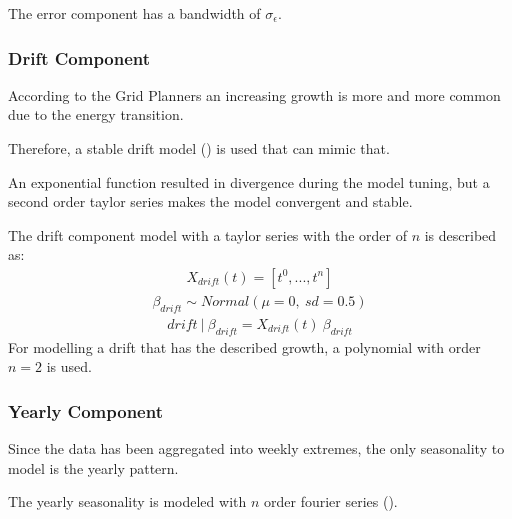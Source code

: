 \documentclass[letterpaper,10pt,english]{sphinxmanual}
\begin{document}
The error component has a bandwidth of \(\sigma_\epsilon\).


\subsubsection{Drift Component}
\label{\detokenize{modeling:drift-component}}
According to the Grid Planners an increasing growth is more and more common due to the energy transition.

Therefore, a stable drift model ({\hyperref[\detokenize{autoapi/src/model/model/index:src.model.model.drift_model}]{}}) is used that can mimic that.

An exponential function resulted in divergence during the model tuning, but a second order taylor series makes the model convergent and stable.

The drift component model with a taylor series with the order of \(n\) is described as:
\begin{equation*}
\begin{split}X_{drift}(t) = [t^0, ...,  t^n]\end{split}
\end{equation*}\begin{equation*}
\begin{split}\beta_{drift} \sim Normal(\mu=0, \:sd=0.5)\end{split}
\end{equation*}\begin{equation*}
\begin{split}drift\:|\:\beta_{drift} = X_{drift}(t)\:\beta_{drift}\end{split}
\end{equation*}
For modelling a drift that has the described growth, a polynomial with order \(n=2\) is used.


\subsubsection{Yearly Component}
\label{\detokenize{modeling:yearly-component}}
Since the data has been aggregated into weekly extremes, the only seasonality to model is the yearly pattern.

The yearly seasonality is modeled with \(n\) order fourier series ({\hyperref[\detokenize{autoapi/src/model/model/index:src.model.model.seasonality_model}]{}}).
\end{document}
